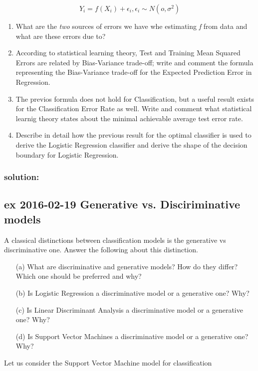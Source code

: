 \documentclass[a4paper,12pt,titlepage]{article} %
\begin{document}
$$ Y_{i} = f(X_{i}) + \epsilon_{i}, \epsilon_{i} \sim N(o, \sigma^{2})$$

\begin{enumerate}
\item What are the \textit{two} sources of errors we have whe estimating \textit{f} from data and what are these errors due to?
\item According to statistical learning theory, Test and Training Mean Squared Errors are related by Bias-Variance trade-off; write and comment the formula representing the Bias-Variance trade-off for the Expected Prediction Error in Regression.
\item The previos formula does not hold for Classification, but a useful result exists for the Classification Error Rate as well. Write and comment what statistical learnig theory states about the minimal achievable average test error rate.
\item Describe in detail how the previous result for the optimal classifier is used to derive the Logistic Regression classifier and derive the shape of the decision boundary for Logistic Regression.
\end{enumerate}

\subsubsection{solution:}


\newpage
\subsection{ex 2016-02-19 Generative vs. Disciriminative models}
A classical distinctions between classification models is the generative vs discriminative one. Answer the following about this distinction.

\begin{itemize}
\item[(a)] What are discriminative and generative models? How do they differ? Which one should be preferred and why?
\item[(b)] Is Logistic Regression a discriminative model or a generative one? Why?
\item[(c)] Is Linear Discriminant Analysis a discriminative model or a generative one? Why?
\item[(d)] Is Support Vector Machines a discriminative model or a generative one? Why?
\end{itemize}

Let us consider the Support Vector Machine model for classification
\end{document}
